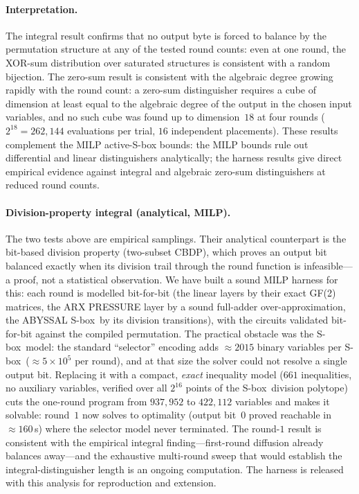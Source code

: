 \documentclass[11pt,a4paper]{article}
\newcommand{\sbx}{\textsf{S-box}}
\begin{document}
\paragraph{Interpretation.}
The integral result confirms that no output byte is forced to balance by
the permutation structure at any of the tested round counts: even at one
round, the XOR-sum distribution over saturated structures is consistent with
a random bijection. The zero-sum result is consistent with the algebraic
degree growing rapidly with the round count: a zero-sum distinguisher
requires a cube of dimension at least equal to the algebraic degree of the
output in the chosen input variables, and no such cube was found up to
dimension~$18$ at four rounds ($2^{18} = 262{,}144$ evaluations per trial,
$16$ independent placements). These results complement the MILP active-S-box
bounds: the MILP bounds rule out differential and linear distinguishers
analytically; the harness results give direct empirical evidence against
integral and algebraic zero-sum distinguishers at reduced round counts.

\paragraph{Division-property integral (analytical, MILP).}
The two tests above are empirical samplings. Their analytical counterpart is the
bit-based division property (two-subset CBDP), which proves an output bit balanced
exactly when its division trail through the round function is infeasible---a
proof, not a statistical observation. We have built a sound MILP harness for this:
each round is modelled bit-for-bit (the linear layers by their exact GF(2)
matrices, the ARX PRESSURE layer by a sound full-adder over-approximation, the
ABYSSAL \sbx\ by its division transitions), with the circuits validated bit-for-bit
against the compiled permutation. The practical obstacle was the \sbx\ model: the
standard ``selector'' encoding adds $\approx\!2015$ binary variables per \sbx\
($\approx\!5\times10^{5}$ per round), and at that size the solver could not resolve
a single output bit. Replacing it with a compact, \emph{exact} inequality model
($661$ inequalities, no auxiliary variables, verified over all $2^{16}$ points of
the \sbx\ division polytope) cuts the one-round program from $937{,}952$ to
$422{,}112$ variables and makes it solvable: round~$1$ now solves to optimality
(output bit~$0$ proved reachable in $\approx\!160$\,s) where the selector model
never terminated. The round-$1$ result is consistent with the empirical integral
finding---first-round diffusion already balances away---and the exhaustive
multi-round sweep that would establish the integral-distinguisher length is an
ongoing computation. The harness is released with this analysis for reproduction
and extension.
\end{document}
